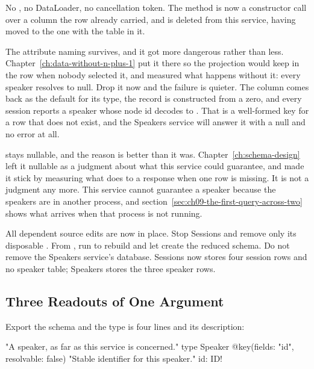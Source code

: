 %
No , no DataLoader, no cancellation token. The method is now a
constructor call over a column the row already carried, and
 is deleted from this service, having moved to the
one with the table in it.

%
The \code{[Parent]} attribute naming  survives, and it got
more dangerous rather than less.
Chapter~\ref{ch:data-without-n-plus-1} put it there so the
projection would keep  in the row when nobody selected it, and
measured what happens without it: every speaker resolves to null. Drop it now
and the failure is quieter. The column comes back as the default for its type,
the record is constructed from a zero, and every session reports a speaker
whose node id decodes to . That is a well-formed key for a row
that does not exist, and the Speakers service will answer it with a null and
no error at all.

%
 stays nullable, and the reason is better than it was.
Chapter~\ref{ch:schema-design} left it nullable as a judgment about what this
service could guarantee, and made it stick by measuring what
 does to a response when one row is missing. It is not
a judgment any more. This service cannot guarantee a speaker because the
speakers are in another process, and section~\ref{sec:ch09-the-first-query-across-two}
shows what arrives when that process is not running.

All dependent source edits are now in place. Stop Sessions and remove only
its disposable . From ,
run  to rebuild and let  create the
reduced schema. Do not remove the Speakers service's database. Sessions now
stores four session rows and no speaker table; Speakers stores the three
speaker rows.

\subsection{Three Readouts of One Argument}

%
Export the schema and the type is four lines and its description:

\begin{graphqlsdl}
"A speaker, as far as this service is concerned."
type Speaker @key(fields: "id", resolvable: false) {
  "Stable identifier for this speaker."
  id: ID!
}
\end{graphqlsdl}

